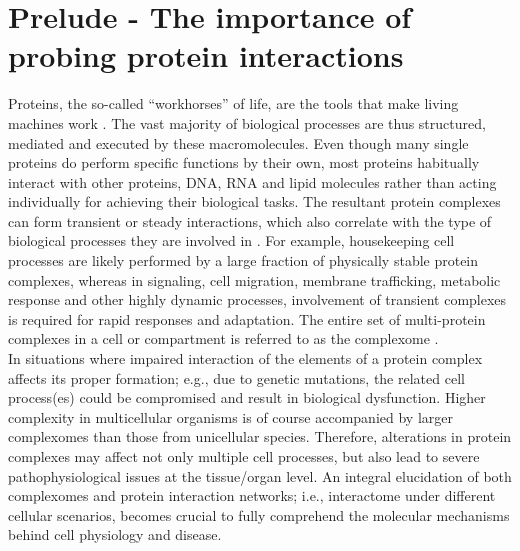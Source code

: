 \section{Prelude - The importance of probing protein interactions}
Proteins, the so-called “workhorses” of life, are the tools that make living machines work  \cite{Adams_2008}. The vast majority of biological processes are thus structured, mediated and executed by these macromolecules. Even though many single proteins do perform specific functions by their own, most proteins habitually interact with other proteins, DNA, RNA and lipid molecules rather than acting individually for achieving their biological tasks. The resultant protein complexes can form transient or steady interactions, which also correlate with the type of biological processes they are involved in \cite{De_Las_Rivas_2010}. For example, housekeeping cell processes are likely performed by a large fraction of physically stable protein complexes, whereas in signaling, cell migration, membrane trafficking, metabolic response and other highly dynamic processes, involvement of transient complexes is required for rapid responses and adaptation. The entire set of multi-protein complexes in a cell or compartment is referred to as the complexome \cite{Ceulemans_2006, Deshaies_2002, Lasserre_2006}.\\
In situations where impaired interaction of the elements of a protein complex affects its proper formation; e.g., due to genetic mutations, the related cell process(es) could be compromised and result in biological dysfunction. Higher complexity in multicellular organisms is of course accompanied by larger complexomes than those from unicellular species. Therefore, alterations in protein complexes may affect not only multiple cell processes, but also lead to severe pathophysiological issues at the tissue/organ level. An integral elucidation of both complexomes and protein interaction networks; i.e., interactome \cite{Vidal_2011} under different cellular scenarios, becomes crucial to fully comprehend the molecular mechanisms behind cell physiology and disease.\\
